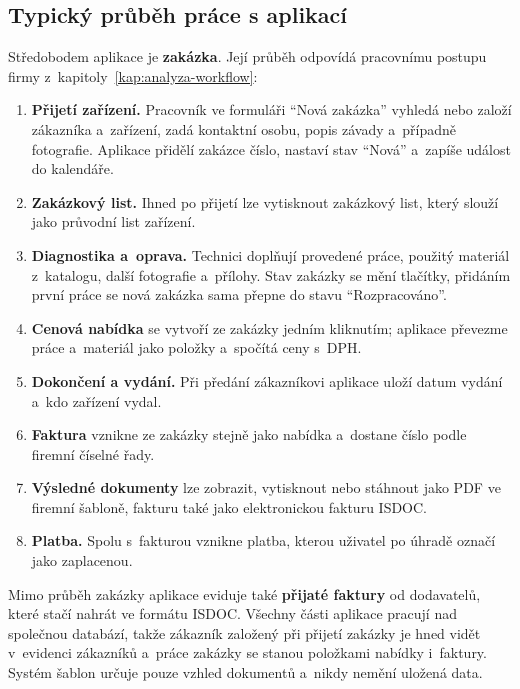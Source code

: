 \subsection{Typický průběh práce s aplikací}\label{sec:popis-aplikace-proces}

Středobodem aplikace je \textbf{zakázka}. Její průběh odpovídá pracovnímu postupu firmy z~kapitoly~\ref{kap:analyza-workflow}:

\begin{enumerate}
\item \textbf{Přijetí zařízení.} Pracovník ve formuláři \enquote{Nová zakázka} vyhledá nebo založí zákazníka a~zařízení, zadá kontaktní osobu, popis závady a~případně fotografie. Aplikace přidělí zakázce číslo, nastaví stav \enquote{Nová} a~zapíše událost do kalendáře.
\item \textbf{Zakázkový list.} Ihned po přijetí lze vytisknout zakázkový list, který slouží jako průvodní list zařízení.
\item \textbf{Diagnostika a~oprava.} Technici doplňují provedené práce, použitý materiál z~katalogu, další fotografie a~přílohy. Stav zakázky se mění tlačítky, přidáním první práce se nová zakázka sama přepne do stavu \enquote{Rozpracováno}.
\item \textbf{Cenová nabídka} se vytvoří ze zakázky jedním kliknutím; aplikace převezme práce a~materiál jako položky a~spočítá ceny s~DPH.
\item \textbf{Dokončení a vydání.} Při předání zákazníkovi aplikace uloží datum vydání a~kdo zařízení vydal.
\item \textbf{Faktura} vznikne ze zakázky stejně jako nabídka a~dostane číslo podle firemní číselné řady.
\item \textbf{Výsledné dokumenty} lze zobrazit, vytisknout nebo stáhnout jako PDF ve firemní šabloně, fakturu také jako elektronickou fakturu ISDOC.
\item \textbf{Platba.} Spolu s~fakturou vznikne platba, kterou uživatel po úhradě označí jako zaplacenou.
\end{enumerate}

Mimo průběh zakázky aplikace eviduje také \textbf{přijaté faktury} od dodavatelů, které stačí nahrát ve formátu ISDOC. Všechny části aplikace pracují nad společnou databází, takže zákazník založený při přijetí zakázky je hned vidět v~evidenci zákazníků a~práce zakázky se stanou položkami nabídky i~faktury. Systém šablon určuje pouze vzhled dokumentů a~nikdy nemění uložená data.
